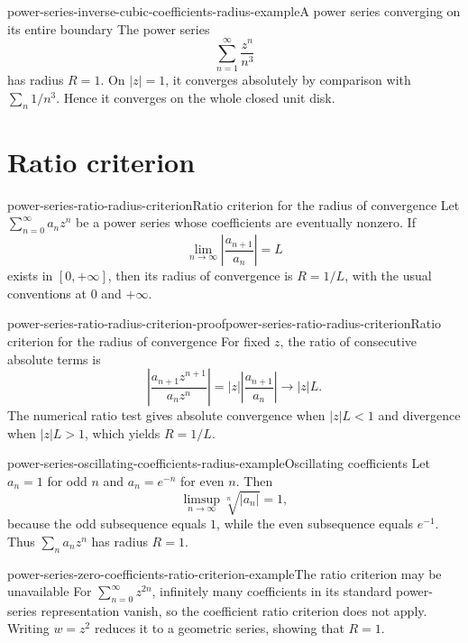 \documentclass[preview]{standalone}
\begin{document}
\begin{snippetexample}{power-series-inverse-cubic-coefficients-radius-example}{A power series converging on its entire boundary}
    The power series
    \[
        \sum_{n=1}^{\infty}\frac{z^n}{n^3}
    \]
    has radius \(R=1\). On \(|z|=1\), it converges absolutely by comparison
    with \(\sum_n1/n^3\). Hence it converges on the whole closed unit disk.
\end{snippetexample}

\section{Ratio criterion}

\begin{snippettheorem}{power-series-ratio-radius-criterion}{Ratio criterion for the radius of convergence}
    Let \(\sum_{n=0}^{\infty}a_nz^n\) be a power series whose coefficients
    are eventually nonzero. If
    \[
        \lim_{n\to\infty}\left|\frac{a_{n+1}}{a_n}\right|=L
    \]
    exists in \([0,+\infty]\), then its radius of convergence is \(R=1/L\),
    with the usual conventions at \(0\) and \(+\infty\).
\end{snippettheorem}

\begin{snippetproof}{power-series-ratio-radius-criterion-proof}{power-series-ratio-radius-criterion}{Ratio criterion for the radius of convergence}
    For fixed \(z\), the ratio of consecutive absolute terms is
    \[
        \left|\frac{a_{n+1}z^{n+1}}{a_nz^n}\right|
        =|z|\left|\frac{a_{n+1}}{a_n}\right|\longrightarrow |z|L.
    \]
    The numerical ratio test gives absolute convergence when \(|z|L<1\)
    and divergence when \(|z|L>1\), which yields \(R=1/L\).
\end{snippetproof}

\begin{snippetexample}{power-series-oscillating-coefficients-radius-example}{Oscillating coefficients}
    Let \(a_n=1\) for odd \(n\) and \(a_n=e^{-n}\) for even \(n\). Then
    \[
        \limsup_{n\to\infty}\sqrt[n]{|a_n|}=1,
    \]
    because the odd subsequence equals \(1\), while the even subsequence
    equals \(e^{-1}\). Thus \(\sum_na_nz^n\) has radius \(R=1\).
\end{snippetexample}

\begin{snippetexample}{power-series-zero-coefficients-ratio-criterion-example}{The ratio criterion may be unavailable}
    For \(\sum_{n=0}^{\infty}z^{2n}\), infinitely many coefficients in its
    standard power-series representation vanish, so the coefficient ratio
    criterion does not apply. Writing \(w=z^2\) reduces it to a geometric
    series, showing that \(R=1\).
\end{snippetexample}
\end{document}
